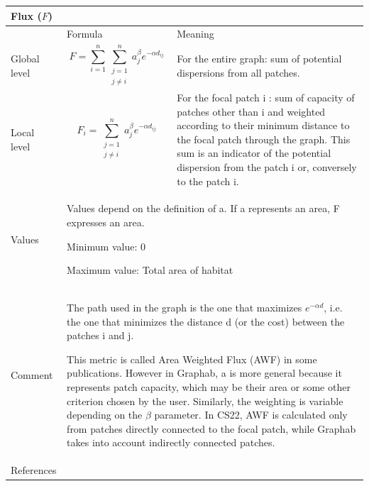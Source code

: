 \documentclass{article}
\begin{document}
\begin{table}[H]
\begin{tabular}{|m{3.24cm}|m{4.4810004cm}m{7.924cm}|}
\hline
\multicolumn{3}{|m{16.044998cm}|}{Flux ($F$)}\\\hline
 &
\multicolumn{1}{m{4.4810004cm}|}{Formula} &
Meaning\\\hline
Global level &
\multicolumn{1}{m{4.4810004cm}|}{\begin{equation*}
F=\sum _{i=1}^{n}{\sum
_{\begin{matrix}j=1\\j{\neq}i\end{matrix}}^{n}{{a}_{j}^{\beta
}}}{e}^{-\alpha {d}_{\mathit{ij}}}
\end{equation*}
} &
For the entire graph: sum of potential dispersions from all
patches.\\\hline
Local level &
\multicolumn{1}{m{4.4810004cm}|}{\begin{equation*}
{F}_{i}=\sum
_{\begin{matrix}j=1\\j{\neq}i\end{matrix}}^{n}{{a}_{j}^{\beta
}}{e}^{-\alpha {d}_{\mathit{ij}}}
\end{equation*}
} &
For the focal patch i : sum of capacity of patches other than i and
weighted according to their minimum distance to the focal patch through
the graph. This sum is an indicator of the potential dispersion from
the patch i or, conversely to the patch i.\\\hline
Values &
\multicolumn{2}{m{12.6050005cm}|}{
Values depend on the definition of a.
If a represents an area, F expresses an area.

Minimum value: 0

Maximum value: Total area of habitat 
}\\\hline
Comment &
\multicolumn{2}{m{12.6050005cm}|}{The path used in the graph is the one
that maximizes  ${e}^{-\mathit{\alpha d}}$, i.e. the one that minimizes
the distance d (or the cost) between the patches i and j. 

This metric is called Area Weighted Flux (AWF) in some publications.
However in Graphab, a is more general because it represents patch
capacity, which may be their area or some other criterion chosen by the
user. Similarly, the weighting is variable depending on the $\beta $
parameter. In CS22, AWF is calculated only from patches directly
connected to the focal patch, while Graphab takes into account
indirectly connected patches.

}\\\hline
References &
\multicolumn{2}{m{12.6050005cm}|}{
\cite{Urban2001} \cite{Saura2009} \cite{2012_SDM}
}\\\hline
\end{tabular}
\end{table}
\end{document}
